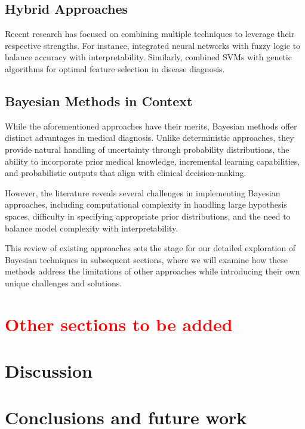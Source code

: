 \documentclass[3p,times,procedia]{elsarticle}
\begin{document}
\subsection{Hybrid Approaches}
Recent research has focused on combining multiple techniques 
to leverage their respective strengths.
For instance, \cite{SAMUEL2017163} integrated neural networks 
with fuzzy logic to balance accuracy with interpretability.
Similarly, \cite{Huerta2006} combined SVMs with genetic
algorithms for optimal feature selection in disease diagnosis.

\subsection{Bayesian Methods in Context}
While the aforementioned approaches have their merits,
Bayesian methods offer distinct advantages in medical 
diagnosis. Unlike deterministic approaches, they provide
natural handling of uncertainty through probability
distributions, the ability to incorporate prior medical
knowledge, incremental learning capabilities, and
probabilistic outputs that align with clinical decision-making. 

However, the literature reveals several challenges in
implementing Bayesian approaches, including computational
complexity in handling large hypothesis spaces, difficulty
in specifying appropriate prior distributions, and the need
to balance model complexity with interpretability. 

This review of existing approaches sets the stage for our
detailed exploration of Bayesian techniques in subsequent
sections, where we will examine how these methods address
the limitations of other approaches while introducing their
own unique challenges and solutions.

\section{\textcolor{red}{Other sections to be added}}

\cite{2018_Dafonte} \cite{2018_Tolstikhin}

\section{Discussion}\label{discussion}

\section{Conclusions and future work}\label{conclusions}

\footnotesize{
  
  
} 
\end{document}
